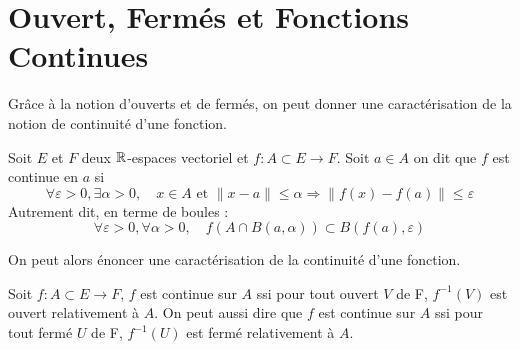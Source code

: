 
\section{Ouvert, Fermés et Fonctions Continues}

Grâce à la notion d'ouverts et de fermés, on peut donner une caractérisation de la notion de continuité d'une fonction. 

\begin{definition}
    Soit $E$ et $F$ deux $\mathbb{R}$-espaces vectoriel et $f : A \subset E \longrightarrow F$. 
    Soit $a \in A$ on dit que $f$ est continue en $a$ si 
        \[ \forall \varepsilon > 0, \exists \alpha > 0, \quad x \in A \text{ et } \| x - a \| \leqslant \alpha \Longrightarrow \| f(x) - f(a) \| \leqslant \varepsilon \] 
    Autrement dit, en terme de boules :
        \[ \forall \varepsilon > 0, \forall \alpha > 0, \quad f(A \cap B(a,\alpha)) \subset B(f(a), \varepsilon) \] 
\end{definition}

On peut alors énoncer une caractérisation de la continuité d'une fonction. 

\begin{proposition}
    Soit $f : A \subset E \longrightarrow F$, $f$ est continue sur $A$ ssi pour tout ouvert $V$ de F, $f^{-1}(V)$ est ouvert 
    relativement à $A$. 
    On peut aussi dire que $f$ est continue sur $A$ ssi pour tout fermé $U$ de F, $f^{-1}(U)$ est fermé 
    relativement à $A$. 
\end{proposition}

\begin{remark}[Illustration]
    
\end{remark}



